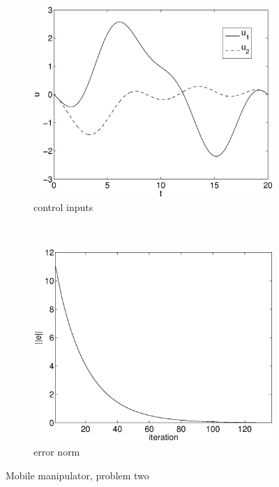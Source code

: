 \begin{figure}[h]
\begin{subfigure}[b]{0.45\textwidth}
\centering
\includegraphics[width=\textwidth]{img/manip_pltf_task_u.eps}
\caption{control inputs}
\end{subfigure}
~
\begin{subfigure}[b]{0.45\textwidth}
\centering
\includegraphics[width=\textwidth]{img/manip_pltf_task_err.eps}
\caption{error norm}
\end{subfigure}
\caption{Mobile manipulator, problem two}
\label{fig:pr2}
\end{figure}